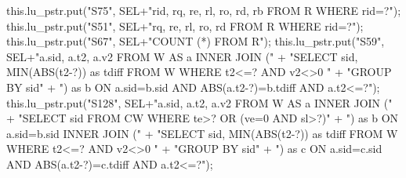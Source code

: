 this.lu_pstr.put("S75", SEL+"rid, rq, re, rl, ro, rd, rb FROM R WHERE rid=?");
\eatline
{}\nwendcode{}\endmoddef{}
this.lu_pstr.put("S51", SEL+"rq, re, rl, ro, rd FROM R WHERE rid=?");
\eatline
{}\nwendcode{}\endmoddef{}
this.lu_pstr.put("S67", SEL+"COUNT (*) FROM R");
\eatline
{}\nwendcode{}\endmoddef{}
this.lu_pstr.put("S59", SEL+"a.sid, a.t2, a.v2 FROM W AS a INNER JOIN ("
      + "SELECT sid, MIN(ABS(t2-?)) as tdiff FROM W WHERE t2<=? AND v2<>0 "
      + "GROUP BY sid"
      + ") as b ON a.sid=b.sid AND ABS(a.t2-?)=b.tdiff AND a.t2<=?");
\eatline
{}\nwendcode{}\endmoddef{}
this.lu_pstr.put("S128", SEL+"a.sid, a.t2, a.v2 FROM W AS a INNER JOIN ("
      + "SELECT sid FROM CW WHERE te>? OR (ve=0 AND sl>?)"
      + ") as b ON a.sid=b.sid INNER JOIN ("
      + "SELECT sid, MIN(ABS(t2-?)) as tdiff FROM W WHERE t2<=? AND v2<>0 "
      + "GROUP BY sid"
      + ") as c ON a.sid=c.sid AND ABS(a.t2-?)=c.tdiff AND a.t2<=?");
\eatline
{}\nwendcode{}\endmoddef{}
